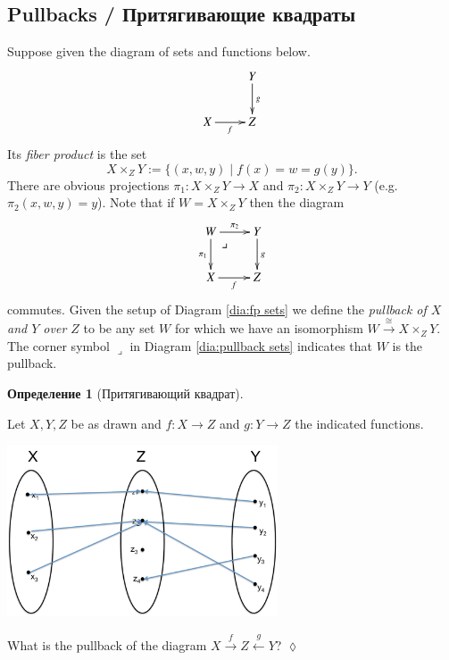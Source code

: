 \documentclass[a4paper]{book}
\makeatletter
\def\to{\rightarrow}
\def\taking{\colon}
\def\iso{\cong}
\def\|{{\;|\;}}
\def\ullimit{\ar@{}[rd]|(.3)*+{\lrcorner}}
\newcommand{\To}[1]{\xrightarrow{#1}}
\newcommand{\Too}[1]{\xrightarrow{\ \ #1\ \ }}
\newcommand{\Fromm}[1]{\xleftarrow{\ \ #1\ \ }}
\theoremstyle{myth}
\newtheorem{excENG}[envENG]{\begin{english}Exercise\end{english}}
\newtheorem{definitionENG}[envENG]{\begin{english}Definition\end{english}}
\newenvironment{exerciseENG}{\begin{excENG}}{\hspace*{\fill}$\lozenge$\end{excENG}}
\newtheorem{definitionRUS}[envRUS]{Определение}
\makeatother
\begin{document}
\begin{russian}
\subsection{Pullbacks / Притягивающие квадраты}

\begin{definitionENG}[Pullback]\label{def:pullback}
Suppose given the diagram of sets and functions below.
\begin{align}\label{dia:fp sets}
\xymatrix{&Y\ar[d]^g\\
X\ar[r]_f&Z}
\end{align}
Its {\em fiber product} is the set 
$$X\times_ZY:=\{(x,w,y)\|f(x)=w=g(y)\}.$$ There are obvious projections $\pi_1\taking X\times_ZY\to X$ and $\pi_2\taking X\times_ZY\to Y$ (e.g. $\pi_2(x,w,y)=y$). Note that if $W=X\times_ZY$ then the diagram 
\begin{align}\label{dia:pullback sets}
\xymatrix{W\ullimit\ar[r]^-{\pi_2}\ar[d]_{\pi_1}&Y\ar[d]^g\\
X\ar[r]_f&Z}
\end{align}
commutes. Given the setup of Diagram \ref{dia:fp sets} we define the {\em pullback of $X$ and $Y$ over $Z$} to be any set $W$ for which we have an isomorphism $W\To{\iso}X\times_ZY$. The corner symbol $\lrcorner$ in Diagram \ref{dia:pullback sets} indicates that $W$ is the pullback.
\end{definitionENG}

\begin{definitionRUS}[Притягивающий квадрат]\label{def:pullback}
 
\end{definitionRUS}

\begin{exerciseENG}
Let $X,Y,Z$ be as drawn and $f\taking X\to Z$ and $g\taking Y\to Z$ the indicated functions. 
\begin{center}
\includegraphics[height=2in]{setPullback}
\end{center}
What is the pullback of the diagram $X\Too{f}Z\Fromm{g}Y$?
\end{exerciseENG}


\end{russian}
\end{document}
